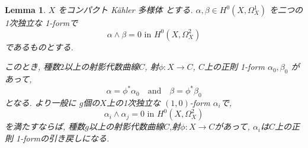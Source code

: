 \documentclass[dvipdfmx,a4paper,11pt]{article} %
\newtheorem{lem}[thm]{Lemma}
\theoremstyle{definition}
\theoremstyle{remark}
\numberwithin{equation}{section}
\begin{document}
\begin{lem}\cite[Lemma 1.10]{Voi}
 \label{lem-Voi-1.10}
\(X\) をコンパクト Kähler 多様体 とする. 
\(\alpha, \beta \in H^0(X,\Omega_X^1)\) を二つの1次独立な 1-formで
\[\alpha \wedge \beta = 0 \text{ in } H^0(X,\Omega_X^2)\]
であるものとする.

このとき, 種数\(2\)以上の射影代数曲線\(C\), 
射\(\phi : X \to C\), $C$上の正則 1-form \(\alpha_0,\beta_0\) があって, 
 \[
 \alpha = \phi^*\alpha_0 \quad \text{and} \quad \beta = \phi^*\beta_0
 \]
 となる. 
 より一般に \(g\)個の$X$上の1次独立な  \((1,0)\)-form \(\alpha_i\)で, 
  \[\alpha_i \wedge \alpha_j = 0 \text{ in } H^0(X,\Omega_X^2)
  \]
  を満たすならば,  種数\(g\)以上の射影代数曲線\(C\),射\(\phi : X \to C\)があって, 
  $\alpha_i$は$C$上の正則 1-formの引き戻しになる. 
\end{lem}
\end{document}
